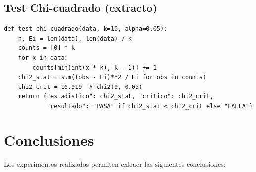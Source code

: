 \documentclass{article}
\begin{document}
\subsection{Test Chi-cuadrado (extracto)}

\begin{lstlisting}[caption={Test de bondad de ajuste Chi-cuadrado},label={lst:chi2}]
def test_chi_cuadrado(data, k=10, alpha=0.05):
    n, Ei = len(data), len(data) / k
    counts = [0] * k
    for x in data:
        counts[min(int(x * k), k - 1)] += 1
    chi2_stat = sum((obs - Ei)**2 / Ei for obs in counts)
    chi2_crit = 16.919  # chi2(9, 0.05)
    return {"estadistico": chi2_stat, "critico": chi2_crit,
            "resultado": "PASA" if chi2_stat < chi2_crit else "FALLA"}
\end{lstlisting}

\section{Conclusiones}

Los experimentos realizados permiten extraer las siguientes conclusiones:
\end{document}

